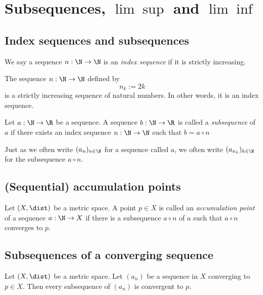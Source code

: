 \section{Subsequences, \texorpdfstring{$\lim\sup$}{limsup} and \texorpdfstring{$\lim\inf$}{liminf}}

\subsection{Index sequences and subsequences}
\begin{definition}
    We say a sequence $n: \N \to \N$ is an \emph{index sequence} if it is strictly increasing.
\end{definition}
\begin{example}
    The sequence $n: \N \to \N$ defined by
    $$n_k := 2k$$
    is a strictly increasing sequence of natural numbers. In other words, it is an index sequence.
\end{example}

\begin{definition}[Subsequence]
    Let $a: \N \to \R$ be a sequence. A sequence $b: \N \to \R$ is called a \emph{subsequence} of $a$ if there exists an index sequence $n: \N \to \N$ such that
    $b = a \circ n$
\end{definition}
Just as we often write $(a_n)_{n \in \N}$ for a sequence called $a$, we often write $(a_{n_k})_{k\in\N}$ for the subsequence $a \circ n$.

\subsection{(Sequential) accumulation points}
\begin{definition}
    Let $(X, \dist)$ be a metric space. A point $p \in X$ is called an \emph{accumulation point} of a sequence $a: \N \to X$ if there is
    a subsequence $a \circ n$ of $a$ such that $a \circ n$ converges to $p$.
\end{definition}

\subsection{Subsequences of a converging sequence}
\begin{proposition}
    Let $(X, \dist)$ be a metric space. Let $(a_n)$ be a sequence in $X$ converging to $p \in X$. Then every subsequence of $(a_n)$ is convergent to $p$.
\end{proposition}

